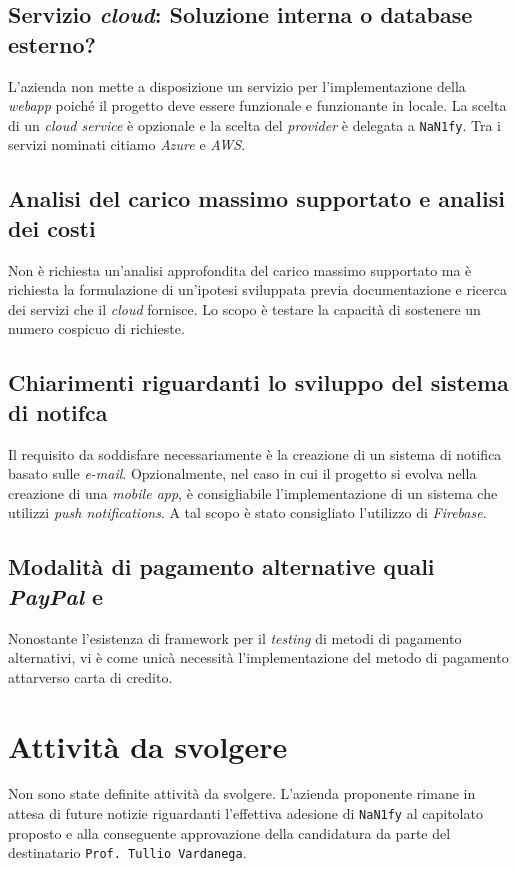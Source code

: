 \subsection{Servizio \textit{cloud}: Soluzione interna o database esterno?}
    L'azienda non mette a disposizione un servizio per l'implementazione della \textit{webapp} poiché il progetto deve essere funzionale e funzionante in locale. La scelta di un \textit{cloud service} è opzionale e la scelta del \textit{provider} è delegata a \texttt{NaN1fy}. Tra i servizi nominati citiamo \textit{Azure} e \textit{AWS}.
\subsection{Analisi del carico massimo supportato e analisi dei costi}
    Non è richiesta un'analisi approfondita del carico massimo supportato ma è richiesta la formulazione di un'ipotesi sviluppata previa documentazione e ricerca dei servizi che il \textit{cloud} fornisce.
    Lo scopo è testare la capacità di sostenere un numero cospicuo di richieste.
\subsection{Chiarimenti riguardanti lo sviluppo del sistema di notifca}
    Il requisito da soddisfare necessariamente è la creazione di un sistema di notifica basato sulle \textit{e-mail}. Opzionalmente, nel caso in cui il progetto si evolva nella creazione di una \textit{mobile app}, è consigliabile l'implementazione di un sistema che utilizzi \textit{push notifications}. A tal scopo è stato consigliato l'utilizzo di \textit{Firebase}.
\subsection{Modalità di pagamento alternative quali \textit{PayPal} e }
    Nonostante l'esistenza di framework per il \textit{testing} di metodi di pagamento alternativi, vi è come unicà necessità l'implementazione del metodo di pagamento attarverso carta di credito.
\section{Attività da svolgere}
    Non sono state definite attività da svolgere. L'azienda proponente rimane in attesa di future notizie riguardanti l'effettiva adesione di \texttt{NaN1fy} al capitolato proposto e alla conseguente approvazione della candidatura da parte del destinatario \texttt{Prof. Tullio Vardanega}.
\\\\
